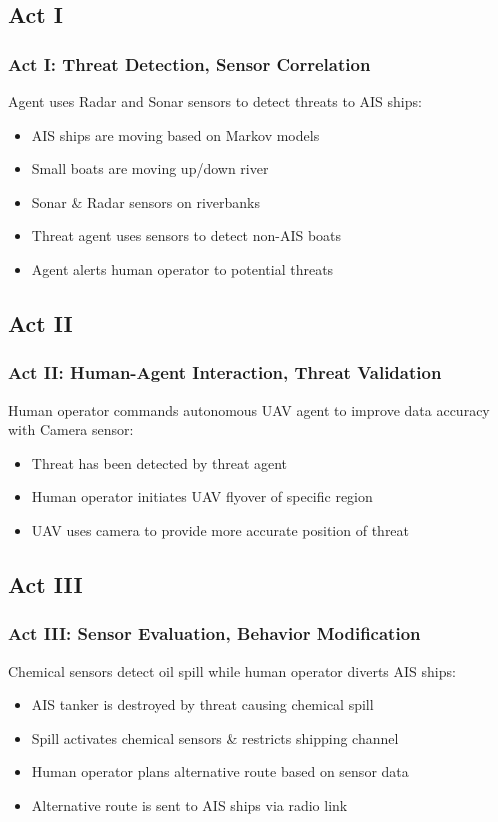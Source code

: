 \documentclass[mathserif,usenames,dvipsnames]{beamer}
\begin{document}
\subsection{Act I}
\frame
{
    \frametitle{Act I: Threat Detection, Sensor Correlation}
    Agent uses Radar and Sonar sensors to detect threats to AIS ships:\\
    \begin{itemize}
        \item AIS ships are moving based on Markov models
        \item Small boats are moving up/down river
        \item Sonar \& Radar sensors on riverbanks
        \item Threat agent uses sensors to detect non-AIS boats 
        \item Agent alerts human operator to potential threats
    \end{itemize}
}
\subsection{Act II}
\frame
{
    \frametitle{Act II: Human-Agent Interaction, Threat Validation}
    Human operator commands autonomous UAV agent to improve data accuracy with Camera sensor:
    \begin{itemize}
        \item Threat has been detected by threat agent 
        \item Human operator initiates UAV flyover of specific region
        \item UAV uses camera to provide more accurate position of threat
    \end{itemize}
}
\subsection{Act III}
\frame
{
    \frametitle{Act III: Sensor Evaluation, Behavior Modification}
    Chemical sensors detect oil spill while human operator diverts AIS ships:
    \begin{itemize}
        \item AIS tanker is destroyed by threat causing chemical spill
        \item Spill activates chemical sensors \& restricts shipping channel
        \item Human operator plans alternative route based on sensor data
        \item Alternative route is sent to AIS ships via radio link
    \end{itemize}
}
\end{document}
